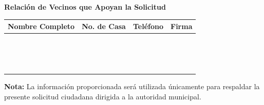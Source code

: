 \documentclass[12pt]{article}
\begin{document}
\newpage


\begin{center}
    \Large\textbf{Relación de Vecinos que Apoyan la Solicitud}
\end{center}

\vspace{0.5cm}

\begin{center}
\begin{tabular}{|p{6cm}|p{2.5cm}|p{2.5cm}|p{4cm}|}
\hline
\textbf{Nombre Completo} &
\textbf{No. de Casa} &
\textbf{Teléfono} &
\textbf{Firma} \\
\hline
\rule{0pt}{1cm} & & & \\
\hline
\rule{0pt}{1cm} & & & \\
\hline
\rule{0pt}{1cm} & & & \\
\hline
\rule{0pt}{1cm} & & & \\
\hline
\rule{0pt}{1cm} & & & \\
\hline
\rule{0pt}{1cm} & & & \\
\hline
\rule{0pt}{1cm} & & & \\
\hline
\rule{0pt}{1cm} & & & \\
\hline
\rule{0pt}{1cm} & & & \\
\hline
\rule{0pt}{1cm} & & & \\
\hline
\rule{0pt}{1cm} & & & \\
\hline
\rule{0pt}{1cm} & & & \\
\hline
\rule{0pt}{1cm} & & & \\
\hline
\rule{0pt}{1cm} & & & \\
\hline
\rule{0pt}{1cm} & & & \\
\hline
\end{tabular}
\end{center}

\vspace{0.8cm}

\textbf{Nota:} La información proporcionada será utilizada únicamente para
respaldar la presente solicitud ciudadana dirigida a la autoridad municipal.
\end{document}
